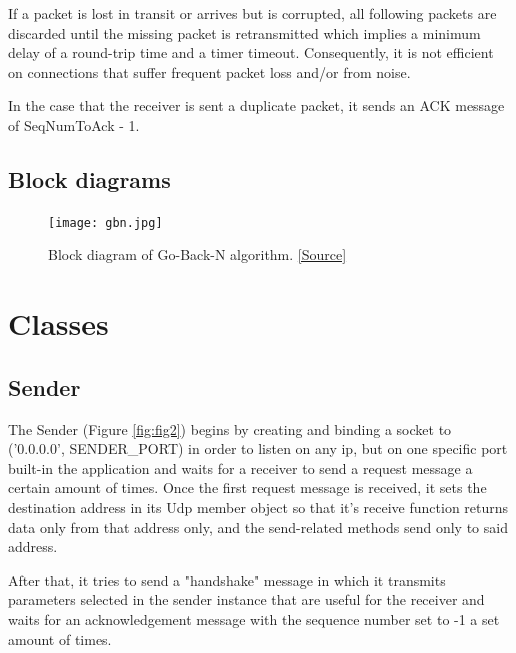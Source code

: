 \documentclass[12pt]{article}
\begin{document}
If a packet is lost in transit or arrives but is corrupted, all following packets are discarded until the missing packet is retransmitted which implies a minimum delay of a round-trip time and a timer timeout. Consequently, it is not efficient on connections that suffer frequent packet loss and/or from noise.

In the case that the receiver is sent a duplicate packet, it sends an ACK message of SeqNumToAck - 1.


\newpage
\subsection{Block diagrams}

\begin{figure}[!htb]
	\centering
	\texttt{[image: gbn.jpg]}
	\caption{Block diagram of Go-Back-N algorithm. \href{http://www.myreadingroom.co.in/notes-and-studymaterial/68-dcn/813-go-back-n-arq-protocol.html}{[Source]}}\label{fig:fig1}
\end{figure}

\section{Classes}

\subsection{Sender}

The Sender (Figure \ref{fig:fig2}) begins by creating and binding a socket to ('0.0.0.0', SENDER\_PORT) in order to listen on any ip, but on one specific port built-in the application and waits for a receiver to send a request message a certain amount of times. Once the first request message is received, it sets the destination address in its Udp member object so that it's receive function returns data only from that address only, and the send-related methods send only to said address.

After that, it tries to send a "handshake" message in which it transmits parameters selected in the sender instance that are useful for the receiver and waits for an acknowledgement message with the sequence number set to -1 a set amount of times.
\end{document}

